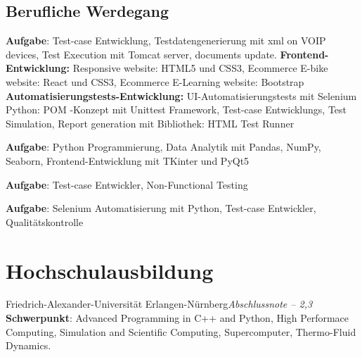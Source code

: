 \documentclass[11pt,a4paper,sans]{moderncv} %
\begin{document}
{\subsection{Berufliche Werdegang}
{\textbf{Aufgabe}: Test-case Entwicklung, Testdatengenerierung mit xml on VOIP devices, Test Execution mit Tomcat server, documents update.
}
{\textbf{Frontend-Entwicklung:} Responsive website: HTML5 und CSS3, Ecommerce E-bike website: React und CSS3, Ecommerce E-Learning website: Bootstrap \newline
{\textbf{Automatisierungstests-Entwicklung:} UI-Automatisierungstests mit Selenium Python: POM -Konzept mit Unittest Framework, Test-case Entwicklungs, Test Simulation, Report generation mit Bibliothek: HTML Test Runner}}

{\textbf{Aufgabe}:  Python Programmierung, Data Analytik mit Pandas, NumPy, Seaborn, Frontend-Entwicklung mit TKinter und PyQt5 }

{\textbf{Aufgabe}: Test-case Entwickler, Non-Functional Testing }

{\textbf{Aufgabe}: Selenium Automatisierung mit Python, Test-case Entwickler, Qualitätskontrolle
}


\section{Hochschulausbildung}
{\newline Friedrich-Alexander-Universit\"at} {Erlangen-N\"urnberg}{\textit{Abschlussnote -- 2,3}}
{\textbf{Schwerpunkt}: Advanced Programming in C++ and Python, High Performace Computing,
Simulation and Scientific Computing, Supercomputer, Thermo-Fluid Dynamics. }

}
\end{document}
